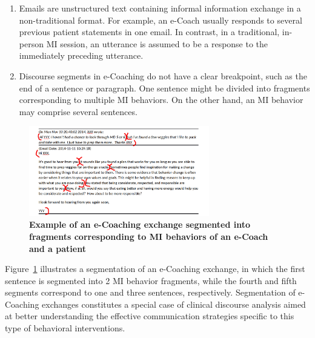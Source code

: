 \documentclass{amia}
\begin{document}
\begin{enumerate}
\item Emails are unstructured text containing informal information exchange in a non-traditional format. For example, an e-Coach usually responds to several previous patient statements in one email. In contrast, in a traditional, in-person MI session, an utterance is assumed to be a response to the immediately preceding utterance.
\item Discourse segments in e-Coaching do not have a clear breakpoint, such as the end of a sentence or paragraph. One sentence might be divided into fragments corresponding to multiple MI behaviors. On the other hand, an MI behavior may comprise several sentences.
\end{enumerate}

\begin{figure}[!htb]
    \centering
    \includegraphics[width=0.7\textwidth]{figures/segment-example.png}
    \caption{\textbf{Example of an e-Coaching exchange segmented into fragments corresponding to MI behaviors of an e-Coach and a patient}}
    \label{fig:text-segment}
\end{figure}

Figure~\ref{fig:text-segment} illustrates a segmentation of an e-Coaching exchange, in which the first sentence is segmented into 2 MI behavior fragments, while the fourth and fifth segments correspond to one and three sentences, respectively. Segmentation of e-Coaching exchanges constitutes a special case of clinical discourse analysis \cite{webber2012discourse} aimed at better understanding the effective communication strategies specific to this type of behavioral interventions. 
\end{document}

